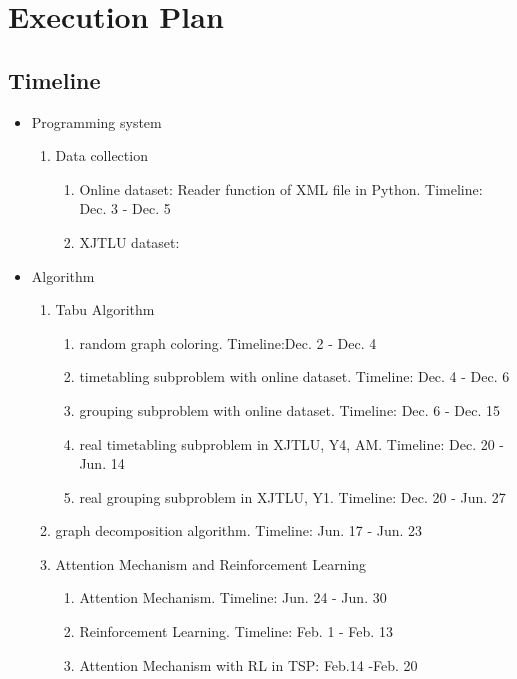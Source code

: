 \documentclass{article}
\begin{document}
\newpage

\section{Execution Plan}
\label{sec: Execution Plan}
\subsection{Timeline}
\begin{itemize}
	\item Programming system
	      \begin{enumerate}
		      \item Data collection
		            \begin{enumerate}
			            \item Online dataset: Reader function of XML file in Python. Timeline: Dec. 3 - Dec. 5
			            \item XJTLU dataset:
		            \end{enumerate}
	      \end{enumerate}
	\item Algorithm
	      \begin{enumerate}
		      \item Tabu Algorithm
		            \begin{enumerate}
			            \item random graph coloring. Timeline:Dec. 2 - Dec. 4
			            \item timetabling subproblem with online dataset. Timeline: Dec. 4 - Dec. 6
			            \item grouping subproblem with online dataset. Timeline: Dec. 6 - Dec. 15
			            \item real timetabling subproblem in XJTLU, Y4, AM. Timeline: Dec. 20 - Jun. 14
			            \item real grouping subproblem in XJTLU, Y1. Timeline: Dec. 20 - Jun. 27
		            \end{enumerate}
		      \item graph decomposition algorithm. Timeline: Jun. 17 - Jun. 23
		      \item Attention Mechanism and  Reinforcement Learning
		            \begin{enumerate}
			            \item Attention Mechanism. Timeline: Jun. 24 - Jun. 30
			            \item Reinforcement Learning. Timeline: Feb. 1 - Feb. 13
			            \item Attention Mechanism with RL in TSP: Feb.14 -Feb. 20

\end{enumerate}
\end{enumerate}
\end{itemize}
\end{document}
